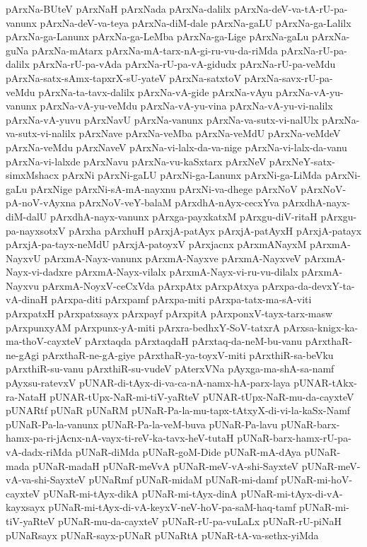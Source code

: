 {pArxNa-BUteV
pArxNaH
pArxNada
pArxNa-dalilx
pArxNa-deV-va-tA-rU-pa-vanunx
pArxNa-deV-va-teya
pArxNa-diM-dale
pArxNa-gaLU
pArxNa-ga-Lalilx
pArxNa-ga-Lanunx
pArxNa-ga-LeMba
pArxNa-ga-Lige
pArxNa-gaLu
pArxNa-guNa
pArxNa-mAtarx
pArxNa-mA-tarx-nA-gi-ru-vu-da-riMda
pArxNa-rU-pa-dalilx
pArxNa-rU-pa-vAda
pArxNa-rU-pa-vA-gidudx
pArxNa-rU-pa-veMdu
pArxNa-satx-sAmx-tapxrX-sU-yateV
pArxNa-satxtoV
pArxNa-savx-rU-pa-veMdu
pArxNa-ta-tavx-dalilx
pArxNa-vA-gide
pArxNa-vAyu
pArxNa-vA-yu-vanunx
pArxNa-vA-yu-veMdu
pArxNa-vA-yu-vina
pArxNa-vA-yu-vi-nalilx
pArxNa-vA-yuvu
pArxNavU
pArxNa-vanunx
pArxNa-va-sutx-vi-nalUlx
pArxNa-va-sutx-vi-nalilx
pArxNave
pArxNa-veMba
pArxNa-veMdU
pArxNa-veMdeV
pArxNa-veMdu
pArxNaveV
pArxNa-vi-lalx-da-va-nige
pArxNa-vi-lalx-da-vanu
pArxNa-vi-lalxde
pArxNavu
pArxNa-vu-kaSxtarx
pArxNeV
pArxNeY-satx-simxMshacx
pArxNi
pArxNi-gaLU
pArxNi-ga-Lanunx
pArxNi-ga-LiMda
pArxNi-gaLu
pArxNige
pArxNi-sA-mA-nayxnu
pArxNi-va-dhege
pArxNoV
pArxNoV-pA-noV-vAyxna
pArxNoV-veY-balaM
pArxdhA-nAyx-cecxYva
pArxdhA-nayx-diM-dalU
pArxdhA-nayx-vanunx
pArxga-payxkatxM
pArxgu-diV-ritaH
pArxgu-pa-nayxsotxV
pArxha
pArxhuH
pArxjA-patAyx
pArxjA-patAyxH
pArxjA-patayx
pArxjA-pa-tayx-neMdU
pArxjA-patoyxV
pArxjacnx
pArxmANayxM
pArxmA-NayxvU
pArxmA-Nayx-vanunx
pArxmA-Nayxve
pArxmA-NayxveV
pArxmA-Nayx-vi-dadxre
pArxmA-Nayx-vilalx
pArxmA-Nayx-vi-ru-vu-dilalx
pArxmA-Nayxvu
pArxmA-NoyxV-ceCxVda
pArxpAtx
pArxpAtxya
pArxpa-da-devxY-ta-vA-dinaH
pArxpa-diti
pArxpamf
pArxpa-miti
pArxpa-tatx-ma-sA-viti
pArxpatxH
pArxpatxsayx
pArxpayf
pArxpitA
pArxponxV-tayx-tarx-masw
pArxpunxyAM
pArxpunx-yA-miti
pArxra-bedhxY-SoV-tatxrA
pArxsa-knigx-ka-ma-thoV-cayxteV
pArxtaqda
pArxtaqdaH
pArxtaq-da-neM-bu-vanu
pArxthaR-ne-gAgi
pArxthaR-ne-gA-giye
pArxthaR-ya-toyxV-miti
pArxthiR-sa-beVku
pArxthiR-su-vanu
pArxthiR-su-vudeV
pAterxVNa
pAyxga-ma-shA-sa-namf
pAyxsu-ratevxV
pUNAR-di-tAyx-di-va-ca-nA-namx-hA-parx-laya
pUNAR-tAkx-ra-NataH
pUNAR-tUpx-NaR-mi-tiV-yaRteV
pUNAR-tUpx-NaR-mu-da-cayxteV
pUNARtf
pUNaR
pUNaRM
pUNaR-Pa-la-mu-tapx-tAtxyX-di-vi-la-kaSx-Namf
pUNaR-Pa-la-vanunx
pUNaR-Pa-la-veM-buva
pUNaR-Pa-lavu
pUNaR-barx-hamx-pa-ri-jAcnx-nA-vayx-ti-reV-ka-tavx-heV-tutaH
pUNaR-barx-hamx-rU-pa-vA-dadx-riMda
pUNaR-diMda
pUNaR-goM-Dide
pUNaR-mA-dAya
pUNaR-mada
pUNaR-madaH
pUNaR-meVvA
pUNaR-meV-vA-shi-SayxteV
pUNaR-meV-vA-va-shi-SayxteV
pUNaRmf
pUNaR-midaM
pUNaR-mi-damf
pUNaR-mi-hoV-cayxteV
pUNaR-mi-tAyx-dikA
pUNaR-mi-tAyx-dinA
pUNaR-mi-tAyx-di-vA-kayxsayx
pUNaR-mi-tAyx-di-vA-keyxV-neV-hoV-pa-saM-haq-tamf
pUNaR-mi-tiV-yaRteV
pUNaR-mu-da-cayxteV
pUNaR-rU-pa-vuLaLx
pUNaR-rU-piNaH
pUNaRsayx
pUNaR-sayx-pUNaR
pUNaRtA
pUNaR-tA-va-sethx-yiMda
}
